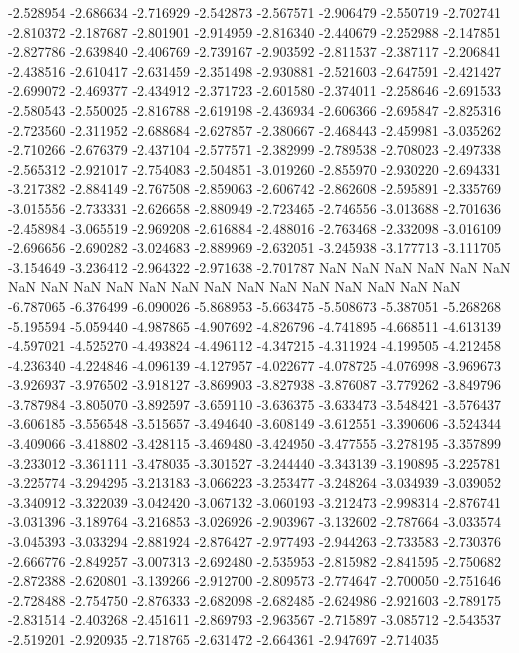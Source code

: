 -2.528954
-2.686634
-2.716929
-2.542873
-2.567571
-2.906479
-2.550719
-2.702741
-2.810372
-2.187687
-2.801901
-2.914959
-2.816340
-2.440679
-2.252988
-2.147851
-2.827786
-2.639840
-2.406769
-2.739167
-2.903592
-2.811537
-2.387117
-2.206841
-2.438516
-2.610417
-2.631459
-2.351498
-2.930881
-2.521603
-2.647591
-2.421427
-2.699072
-2.469377
-2.434912
-2.371723
-2.601580
-2.374011
-2.258646
-2.691533
-2.580543
-2.550025
-2.816788
-2.619198
-2.436934
-2.606366
-2.695847
-2.825316
-2.723560
-2.311952
-2.688684
-2.627857
-2.380667
-2.468443
-2.459981
-3.035262
-2.710266
-2.676379
-2.437104
-2.577571
-2.382999
-2.789538
-2.708023
-2.497338
-2.565312
-2.921017
-2.754083
-2.504851
-3.019260
-2.855970
-2.930220
-2.694331
-3.217382
-2.884149
-2.767508
-2.859063
-2.606742
-2.862608
-2.595891
-2.335769
-3.015556
-2.733331
-2.626658
-2.880949
-2.723465
-2.746556
-3.013688
-2.701636
-2.458984
-3.065519
-2.969208
-2.616884
-2.488016
-2.763468
-2.332098
-3.016109
-2.696656
-2.690282
-3.024683
-2.889969
-2.632051
-3.245938
-3.177713
-3.111705
-3.154649
-3.236412
-2.964322
-2.971638
-2.701787
NaN
NaN
NaN
NaN
NaN
NaN
NaN
NaN
NaN
NaN
NaN
NaN
NaN
NaN
NaN
NaN
NaN
NaN
NaN
NaN
-6.787065
-6.376499
-6.090026
-5.868953
-5.663475
-5.508673
-5.387051
-5.268268
-5.195594
-5.059440
-4.987865
-4.907692
-4.826796
-4.741895
-4.668511
-4.613139
-4.597021
-4.525270
-4.493824
-4.496112
-4.347215
-4.311924
-4.199505
-4.212458
-4.236340
-4.224846
-4.096139
-4.127957
-4.022677
-4.078725
-4.076998
-3.969673
-3.926937
-3.976502
-3.918127
-3.869903
-3.827938
-3.876087
-3.779262
-3.849796
-3.787984
-3.805070
-3.892597
-3.659110
-3.636375
-3.633473
-3.548421
-3.576437
-3.606185
-3.556548
-3.515657
-3.494640
-3.608149
-3.612551
-3.390606
-3.524344
-3.409066
-3.418802
-3.428115
-3.469480
-3.424950
-3.477555
-3.278195
-3.357899
-3.233012
-3.361111
-3.478035
-3.301527
-3.244440
-3.343139
-3.190895
-3.225781
-3.225774
-3.294295
-3.213183
-3.066223
-3.253477
-3.248264
-3.034939
-3.039052
-3.340912
-3.322039
-3.042420
-3.067132
-3.060193
-3.212473
-2.998314
-2.876741
-3.031396
-3.189764
-3.216853
-3.026926
-2.903967
-3.132602
-2.787664
-3.033574
-3.045393
-3.033294
-2.881924
-2.876427
-2.977493
-2.944263
-2.733583
-2.730376
-2.666776
-2.849257
-3.007313
-2.692480
-2.535953
-2.815982
-2.841595
-2.750682
-2.872388
-2.620801
-3.139266
-2.912700
-2.809573
-2.774647
-2.700050
-2.751646
-2.728488
-2.754750
-2.876333
-2.682098
-2.682485
-2.624986
-2.921603
-2.789175
-2.831514
-2.403268
-2.451611
-2.869793
-2.963567
-2.715897
-3.085712
-2.543537
-2.519201
-2.920935
-2.718765
-2.631472
-2.664361
-2.947697
-2.714035
